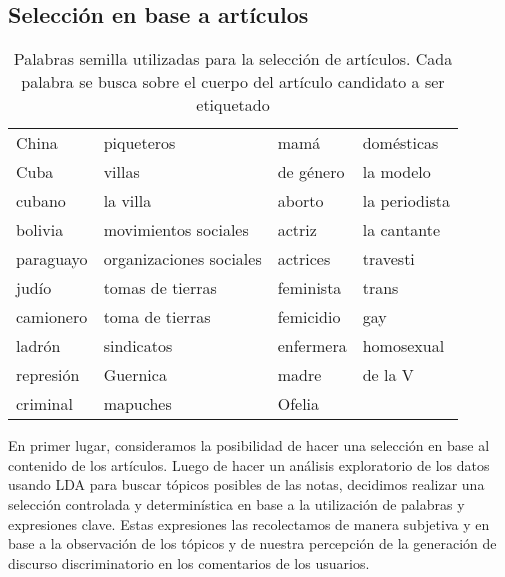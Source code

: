 \subsection{Selección en base a artículos}

\begin{table}[b!]
    \centering
    \small
    \begin{tabular}{p{}  p{} p{} p{}}
    \hline
    China        &  piqueteros              &  mamá                & domésticas            \\
    Cuba         &  villas                  &  de género           & la modelo             \\
    cubano       &  la villa                &  aborto              & la periodista         \\
    bolivia      &  movimientos sociales    &  actriz              & la cantante           \\
    paraguayo    &  organizaciones sociales &  actrices            & travesti              \\
    judío        &  tomas de tierras        &  feminista           & trans                 \\
    camionero    &  toma de tierras         &  femicidio           & gay                   \\
    ladrón       &  sindicatos              &  enfermera           & homosexual            \\
    represión    &  Guernica                &  madre               & de la V               \\
    criminal     &  mapuches                &  Ofelia              &                       \\
    \hline
    \end{tabular}
    \caption{Palabras semilla utilizadas para la selección de artículos. Cada palabra se busca sobre el cuerpo del artículo candidato a ser etiquetado}
    \label{tab:palabras_articulos}
\end{table}

En primer lugar, consideramos la posibilidad de hacer una selección en base al contenido de los artículos. Luego de hacer un análisis exploratorio de los datos usando LDA \cite{blei2003latent} para buscar tópicos posibles de las notas, decidimos realizar una selección controlada y determinística en base a la utilización de palabras y expresiones clave. Estas expresiones las recolectamos de manera subjetiva y en base a la observación de los tópicos y de nuestra percepción de la generación de discurso discriminatorio en los comentarios de los usuarios.

